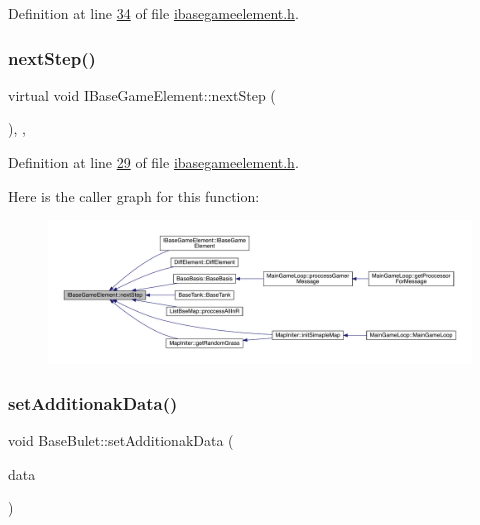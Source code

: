 Definition at line \hyperlink{a00047_source_l00034}{34} of file \hyperlink{a00047_source}{ibasegameelement.\+h}.

\mbox{\label{a00137_ae2be75da1a2a9edfabe993770e24654a}} 
\subsubsection{\texorpdfstring{next\+Step()}{nextStep()}}
{\footnotesize\ttfamily virtual void I\+Base\+Game\+Element\+::next\+Step (\begin{DoxyParamCaption}{ }\end{DoxyParamCaption})\hspace{0.3cm}{\ttfamily [inline]}, {\ttfamily [virtual]}, {\ttfamily [inherited]}}



Definition at line \hyperlink{a00047_source_l00029}{29} of file \hyperlink{a00047_source}{ibasegameelement.\+h}.

Here is the caller graph for this function\+:
\nopagebreak
\begin{figure}[H]
\begin{center}
\leavevmode
\includegraphics[width=350pt]{d2/df5/a00137_ae2be75da1a2a9edfabe993770e24654a_icgraph}
\end{center}
\end{figure}
\mbox{\label{a00153_ae97774994602a89562688f97339b9eb3}} 
\subsubsection{\texorpdfstring{set\+Additionak\+Data()}{setAdditionakData()}}
{\footnotesize\ttfamily void Base\+Bulet\+::set\+Additionak\+Data (\begin{DoxyParamCaption}\item[{Q\+Byte\+Array $\ast$}]{data }\end{DoxyParamCaption})\hspace{0.3cm}{\ttfamily [virtual]}}



